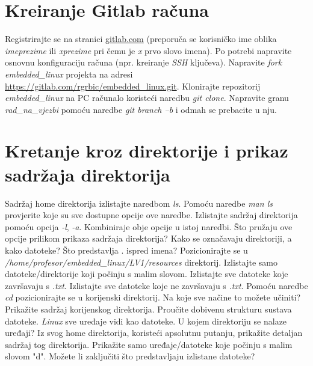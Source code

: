 \documentclass[11pt]{article}
\begin{document}
\section{Kreiranje Gitlab računa}
Registrirajte se na stranici \url{gitlab.com} (preporuča se korisničko ime
 oblika \textit{imeprezime} ili \textit{xprezime} pri čemu je \textit{x} prvo
 slovo imena). Po potrebi napravite osnovnu konfiguraciju računa (npr.
 kreiranje \textit{SSH} ključeva). Napravite \textit{fork}
 \textit{embedded\_linux} projekta na adresi
 \url{https://gitlab.com/rgrbic/embedded\_linux.git}.
 \newline
 \newline
 Klonirajte repozitorij \textit{embedded\_linux} na PC računalo koristeći
 naredbu \textit{git clone}. Napravite granu \textit{rad\_na\_vjezbi} pomoću
 naredbe \textit{git branch –b} i odmah se prebacite u nju.
 \section{Kretanje kroz direktorije i prikaz sadržaja direktorija}
Sadržaj home direktorija izlistajte naredbom \textit{ls}. Pomoću naredbe
 \textit{man ls} provjerite koje su sve dostupne opcije ove naredbe. Izlistajte
 sadržaj direktorija pomoću opcija \textit{-l}, \textit{-a}. Kombiniraje obje
 opcije u istoj naredbi. Što pružaju ove opcije prilikom prikaza sadržaja
 direktorija? Kako se označavaju direktoriji, a kako datoteke? Što predstavlja
 . ispred imena?
\newline
\newline
Pozicionirajte se u \textit{/home/profesor/embedded\_linux/LV1/resources}
 direktorij. Izlistajte samo datoteke/direktorije koji počinju s malim slovom.
 Izlistajte sve datoteke koje završavaju s \textit{.txt}. Izlistajte sve
 datoteke koje ne završavaju s \textit{.txt}.
\newline
\newline
Pomoću naredbe \textit{cd} pozicionirajte se u korijenski direktorij. Na koje
 sve načine to možete učiniti? Prikažite sadržaj korijenskog direktorija.
 Proučite dobivenu strukturu sustava datoteke.
\newline
\newline
\textit{Linux} sve uređaje vidi kao datoteke. U kojem direktoriju se nalaze
 uređaji? Iz svog home direktorija, koristeći apsolutnu putanju, prikažite
 detaljan sadržaj tog direktorija. Prikažite samo uređaje/datoteke koje počinju
 s malim slovom "d". Možete li zaključiti što predstavljaju izlistane datoteke?
\end{document}
